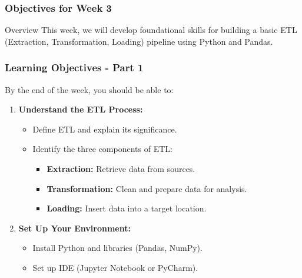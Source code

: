 \documentclass[aspectratio=169]{beamer}
\begin{document}
\begin{frame}[fragile]
    \frametitle{Objectives for Week 3}
    \begin{block}{Overview}
        This week, we will develop foundational skills for building a basic ETL (Extraction, Transformation, Loading) pipeline using Python and Pandas. 
    \end{block}
\end{frame}

\begin{frame}[fragile]
    \frametitle{Learning Objectives - Part 1}
    By the end of the week, you should be able to:
    \begin{enumerate}
        \item \textbf{Understand the ETL Process:}
        \begin{itemize}
            \item Define ETL and explain its significance.
            \item Identify the three components of ETL:
            \begin{itemize}
                \item \textbf{Extraction:} Retrieve data from sources.
                \item \textbf{Transformation:} Clean and prepare data for analysis.
                \item \textbf{Loading:} Insert data into a target location.
            \end{itemize}
        \end{itemize}

        \item \textbf{Set Up Your Environment:}
        \begin{itemize}
            \item Install Python and libraries (Pandas, NumPy).
            \item Set up IDE (Jupyter Notebook or PyCharm).
        \end{itemize}
    \end{enumerate}
\end{frame}
\end{document}
